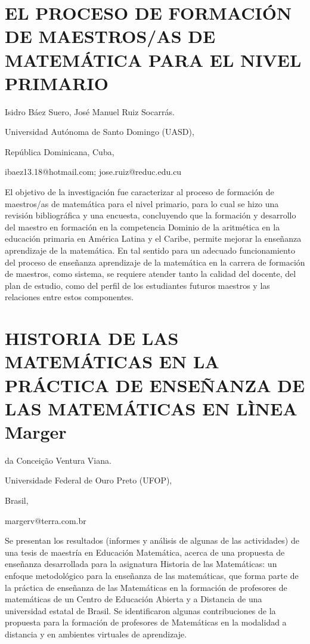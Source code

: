 \section{EL PROCESO DE FORMACIÓN DE MAESTROS/AS DE MATEMÁTICA PARA EL NIVEL
PRIMARIO }

\begin{datos}

Isidro Báez Suero, José Manuel Ruiz Socarrás. 

Universidad Autónoma de Santo Domingo (UASD),

República Dominicana, Cuba,

ibaez13.18@hotmail.com; jose.ruiz@reduc.edu.cu

\end{datos}

El objetivo de la investigación fue caracterizar al proceso de formación
de maestros/as de matemática para el nivel primario, para lo cual
se hizo una revisión bibliográfica y una encuesta, concluyendo que
la formación y desarrollo del maestro en formación en la competencia
Dominio de la aritmética en la educación primaria en América Latina
y el Caribe, permite mejorar la enseñanza aprendizaje de la matemática.
En tal sentido para un adecuado funcionamiento del proceso de enseñanza
aprendizaje de la matemática en la carrera de formación de maestros,
como sistema, se requiere atender tanto la calidad del docente, del
plan de estudio, como del perfil de los estudiantes futuros maestros
y las relaciones entre estos componentes.


\section{HISTORIA DE LAS MATEMÁTICAS EN LA PRÁCTICA DE ENSEÑANZA DE LAS MATEMÁTICAS
EN LÌNEA Marger}

\begin{datos}

da Conceição Ventura Viana.

Universidade Federal de Ouro Preto (UFOP),

Brasil,

margerv@terra.com.br 

\end{datos}

Se presentan los resultados (informes y análisis de algunas de las
actividades) de una tesis de maestría en Educación Matemática, acerca
de una propuesta de enseñanza desarrollada para la asignatura Historia
de las Matemáticas: un enfoque metodológico para la enseñanza de las
matemáticas, que forma parte de la práctica de enseñanza de las Matemáticas
en la formación de profesores de matemáticas de un Centro de Educación
Abierta y a Distancia de una universidad estatal de Brasil. Se identificaron
algunas contribuciones de la propuesta para la formación de profesores
de Matemáticas en la modalidad a distancia y en ambientes virtuales
de aprendizaje.


